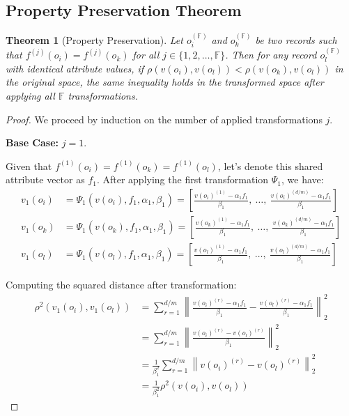 \documentclass[numbers,sort]{article}
\newtheorem{theorem}{Theorem}
\begin{document}
\subsection{Property Preservation Theorem}
\begin{theorem}[Property Preservation]

Let $o_i^{(\mathbb{F})}$ and $o_k^{(\mathbb{F})}$ be two records such that $f^{(j)}(o_i) = f^{(j)}(o_k)$ for all $j \in \{1, 2, \ldots, \mathbb{F}\}$. Then for any record $o_l^{(\mathbb{F})}$ with identical attribute values, if $\rho(v(o_i), v(o_l)) < \rho(v(o_k), v(o_l))$ in the original space, the same inequality holds in the transformed space after applying all $\mathbb{F}$ transformations.
\label{thm:property-preservation-proof}
\end{theorem}

\begin{proof}
We proceed by induction on the number of applied transformations $j$.

\noindent\textbf{Base Case:} $j=1$. 

Given that $f^{(1)}(o_i) = f^{(1)}(o_k) = f^{(1)}(o_l)$, let's denote this shared attribute vector as $f_1$. After applying the first transformation $\Psi_1$, we have:
\begin{align}
v_1(o_i) &= \Psi_1(v(o_i), f_1, \alpha_1, \beta_1) = \left[\frac{v(o_i)^{(1)} - \alpha_1 f_1}{\beta_1},~\ldots,~\frac{v(o_i)^{(d/m)} - \alpha_1 f_1}{\beta_1}\right] \\
v_1(o_k) &= \Psi_1(v(o_k), f_1, \alpha_1, \beta_1) = \left[\frac{v(o_k)^{(1)} - \alpha_1 f_1}{\beta_1},~\ldots,~\frac{v(o_k)^{(d/m)} - \alpha_1 f_1}{\beta_1}\right] \\
v_1(o_l) &= \Psi_1(v(o_l), f_1, \alpha_1, \beta_1) = \left[\frac{v(o_l)^{(1)} - \alpha_1 f_1}{\beta_1},~\ldots,~\frac{v(o_l)^{(d/m)} - \alpha_1 f_1}{\beta_1}\right]
\end{align}

Computing the squared distance after transformation:
\begin{align}
\rho^2(v_1(o_i), v_1(o_l)) &= \sum_{r=1}^{d/m} \left\|\frac{v(o_i)^{(r)} - \alpha_1 f_1}{\beta_1} - \frac{v(o_l)^{(r)} - \alpha_1 f_1}{\beta_1}\right\|_2^2 \\
&= \sum_{r=1}^{d/m} \left\|\frac{v(o_i)^{(r)} - v(o_l)^{(r)}}{\beta_1}\right\|_2^2 \\
&= \frac{1}{\beta_1^2} \sum_{r=1}^{d/m} \left\|v(o_i)^{(r)} - v(o_l)^{(r)}\right\|_2^2 \\
&= \frac{1}{\beta_1^2} \rho^2(v(o_i), v(o_l))
\end{align}


\end{proof}
\end{document}
